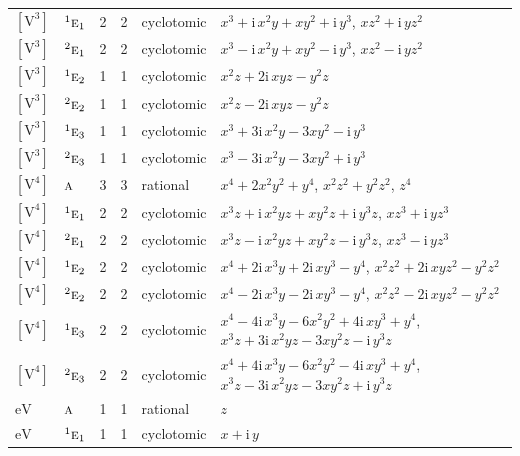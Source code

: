 \documentclass[10pt,a4paper]{article}
\numberwithin{equation}{section}
\newcommand{\irr}[1]{\text{\normalfont\scshape #1}}
\newcommand{\conjpair}[1]{{}^{#1}}
\newcommand{\iunit}{\mathrm{i}}
\newcommand{\jahn}[1]{\mathrm{#1}}
\newlength{\fillwidth}\newlength{\cellwidth}\newlength{\colwidth}
\begin{document}
{\begin{longtable}{@{}llrrl>{\RaggedRight\arraybackslash}p{\fillwidth}@{}}
$\jahn{[V^{3}]}$ & $\conjpair{1}\irr{e}_{1}$ & 2 & 2 & cyclotomic & $x^{3} + \iunit{}\,x^{2}y + xy^{2} + \iunit{}\,y^{3}$, $xz^{2} + \iunit{}\,yz^{2}$\\
$\jahn{[V^{3}]}$ & $\conjpair{2}\irr{e}_{1}$ & 2 & 2 & cyclotomic & $x^{3} - \iunit{}\,x^{2}y + xy^{2} - \iunit{}\,y^{3}$, $xz^{2} - \iunit{}\,yz^{2}$\\
$\jahn{[V^{3}]}$ & $\conjpair{1}\irr{e}_{2}$ & 1 & 1 & cyclotomic & $x^{2}z + 2\iunit{}\,xyz - y^{2}z$\\
$\jahn{[V^{3}]}$ & $\conjpair{2}\irr{e}_{2}$ & 1 & 1 & cyclotomic & $x^{2}z - 2\iunit{}\,xyz - y^{2}z$\\
$\jahn{[V^{3}]}$ & $\conjpair{1}\irr{e}_{3}$ & 1 & 1 & cyclotomic & $x^{3} + 3\iunit{}\,x^{2}y - 3xy^{2} - \iunit{}\,y^{3}$\\
$\jahn{[V^{3}]}$ & $\conjpair{2}\irr{e}_{3}$ & 1 & 1 & cyclotomic & $x^{3} - 3\iunit{}\,x^{2}y - 3xy^{2} + \iunit{}\,y^{3}$\\
$\jahn{[V^{4}]}$ & $\irr{a}$ & 3 & 3 & rational & $x^{4} + 2x^{2}y^{2} + y^{4}$, $x^{2}z^{2} + y^{2}z^{2}$, $z^{4}$\\
$\jahn{[V^{4}]}$ & $\conjpair{1}\irr{e}_{1}$ & 2 & 2 & cyclotomic & $x^{3}z + \iunit{}\,x^{2}yz + xy^{2}z + \iunit{}\,y^{3}z$, $xz^{3} + \iunit{}\,yz^{3}$\\
$\jahn{[V^{4}]}$ & $\conjpair{2}\irr{e}_{1}$ & 2 & 2 & cyclotomic & $x^{3}z - \iunit{}\,x^{2}yz + xy^{2}z - \iunit{}\,y^{3}z$, $xz^{3} - \iunit{}\,yz^{3}$\\
$\jahn{[V^{4}]}$ & $\conjpair{1}\irr{e}_{2}$ & 2 & 2 & cyclotomic & $x^{4} + 2\iunit{}\,x^{3}y + 2\iunit{}\,xy^{3} - y^{4}$, $x^{2}z^{2} + 2\iunit{}\,xyz^{2} - y^{2}z^{2}$\\
$\jahn{[V^{4}]}$ & $\conjpair{2}\irr{e}_{2}$ & 2 & 2 & cyclotomic & $x^{4} - 2\iunit{}\,x^{3}y - 2\iunit{}\,xy^{3} - y^{4}$, $x^{2}z^{2} - 2\iunit{}\,xyz^{2} - y^{2}z^{2}$\\
$\jahn{[V^{4}]}$ & $\conjpair{1}\irr{e}_{3}$ & 2 & 2 & cyclotomic & $x^{4} - 4\iunit{}\,x^{3}y - 6x^{2}y^{2} + 4\iunit{}\,xy^{3} + y^{4}$, $x^{3}z + 3\iunit{}\,x^{2}yz - 3xy^{2}z - \iunit{}\,y^{3}z$\\
$\jahn{[V^{4}]}$ & $\conjpair{2}\irr{e}_{3}$ & 2 & 2 & cyclotomic & $x^{4} + 4\iunit{}\,x^{3}y - 6x^{2}y^{2} - 4\iunit{}\,xy^{3} + y^{4}$, $x^{3}z - 3\iunit{}\,x^{2}yz - 3xy^{2}z + \iunit{}\,y^{3}z$\\
$\jahn{eV}$ & $\irr{a}$ & 1 & 1 & rational & $z$\\
$\jahn{eV}$ & $\conjpair{1}\irr{e}_{1}$ & 1 & 1 & cyclotomic & $x + \iunit{}\,y$\\

\end{longtable}}
\end{document}

